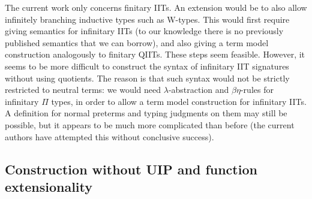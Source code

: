 \documentclass[a4paper,UKenglish,cleveref, autoref]{lipics-v2019}
\begin{document}
The current work only concerns finitary IITs. An extension would be to also
allow infinitely branching inductive types such as W-types. This would first
require giving semantics for infinitary IITs (to our knowledge there is no
previously published semantics that we can borrow), and also giving a term model
construction analogously to finitary QIITs. These steps seem feasible. However,
it seems to be more difficult to construct the syntax of infinitary IIT
signatures without using quotients. The reason is that such syntax would not be
strictly restricted to neutral terms: we would need $\lambda$-abstraction and
$\beta\eta$-rules for infinitary $\Pi$ types, in order to allow a term model
construction for infinitary IITs. A definition for normal preterms and typing
judgments on them may still be possible, but it appears to be much more
complicated than before (the current authors have attempted this without
conclusive success).

\subsection{Construction without UIP and function extensionality}



\end{document}
